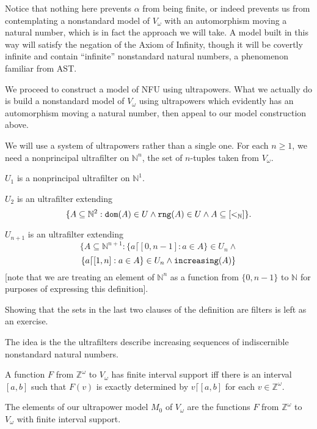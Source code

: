 \documentclass{slides}
\begin{document}
\begin{slide}

Notice that nothing here prevents $\alpha$ from being finite, or indeed prevents us from contemplating a nonstandard model of $V_\omega$ with an automorphism moving a natural number, which is in fact the approach we will take.  A model built in this way will satisfy the negation of the Axiom of Infinity, though it will be covertly infinite and contain ``infinite'' nonstandard natural numbers, a phenomenon familiar from AST.

\end{slide}

\begin{slide}

We proceed to construct a model of NFU using ultrapowers.  What we actually do is build a nonstandard model of $V_\omega$ using ultrapowers which evidently has an automorphism moving a natural number, then appeal to our model construction above.

We will use a system of ultrapowers rather than a single one.  For each $n\geq 1$, we need a nonprincipal ultrafilter
on $\mathbb N^n$, the set of $n$-tuples taken from $V_\omega$.

\end{slide}

\begin{slide}

$U_1$ is a nonprincipal ultrafilter on $\mathbb N^1$.

$U_2$ is an ultrafilter extending $$\{A \subseteq \mathbb N^2:{\tt dom}(A) \in U \wedge {\tt rng}(A) \in U \wedge A \subseteq [<_{\mathbb N}]\}.$$

$U_{n+1}$ is an ultrafilter extending $$\{A \subseteq \mathbb N^{n+1}: \{a\lceil [0,n-1]:a \in A\} \in U_n \wedge $$ $$ \{a \lceil[1,n]:a \in A\} \in U_n \wedge {\tt increasing}(A)\}$$ [note that we are treating an element of $\mathbb N^n$ as a function from $\{0,n-1\}$ to $\mathbb N$ for purposes of expressing this definition].

\end{slide}

\begin{slide}

Showing that the sets in the last two clauses of the definition are filters is left as an exercise.

The idea is the the ultrafilters describe increasing sequences of indiscernible nonstandard natural numbers.

A function $F$ from $\mathbb Z^\omega$ to $V_\omega$ has finite interval support iff there is an interval
$[a,b]$ such that $F(v)$ is exactly determined by $v\lceil [a,b]$ for each $v \in \mathbb Z^\omega$.

The elements of our ultrapower model $M_0$ of $V_\omega$ are the functions $F$ from $\mathbb Z^\omega$ to $V_\omega$ with finite interval support.

\end{slide}
\end{document}
